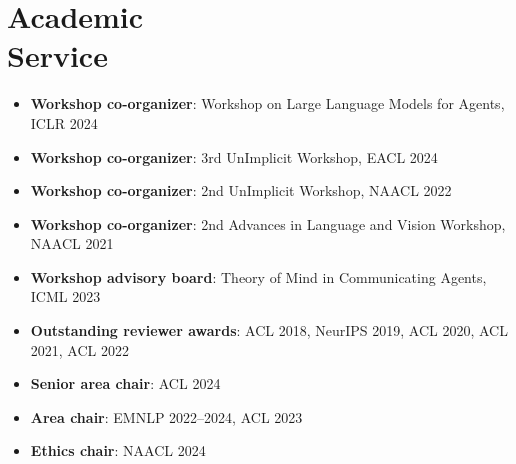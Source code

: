 \section{Academic \\ Service}
\begin{itemize}[leftmargin=-0.4mm,partopsep=0pt,label=]
  \item \textbf{Workshop co-organizer}: Workshop on Large Language Models for Agents, ICLR 2024

  \item \textbf{Workshop co-organizer}: 3rd UnImplicit Workshop, EACL 2024

  \item \textbf{Workshop co-organizer}: 2nd UnImplicit Workshop, NAACL 2022

  \item \textbf{Workshop co-organizer}: 2nd Advances in Language and Vision Workshop, NAACL 2021

  \item \textbf{Workshop advisory board}: Theory of Mind in Communicating Agents, ICML 2023

  \item \textbf{Outstanding reviewer awards}: ACL 2018, NeurIPS 2019, ACL 2020, ACL 2021, ACL 2022

  \item \textbf{Senior area chair}: ACL 2024

  \item \textbf{Area chair}: EMNLP 2022--2024, ACL 2023

  \item \textbf{Ethics chair}: NAACL 2024







\end{itemize}
 \vspace{-0.5em}

